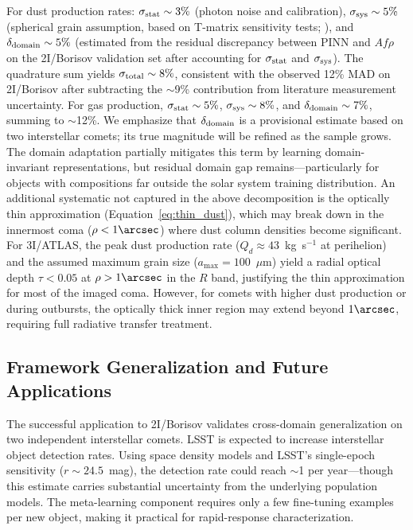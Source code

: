 \documentclass[preprint2]{aastex631}
\begin{document}
For dust production rates: $\sigma_{\rm stat} \sim 3\%$ (photon noise and calibration), $\sigma_{\rm sys} \sim 5\%$ (spherical grain assumption, based on T-matrix sensitivity tests; \citealt{kolokolova04,shen11}), and $\delta_{\rm domain} \sim 5\%$ (estimated from the residual discrepancy between PINN and $Af\rho$ on the 2I/Borisov validation set after accounting for $\sigma_{\rm stat}$ and $\sigma_{\rm sys}$). The quadrature sum yields $\sigma_{\rm total} \sim 8\%$, consistent with the observed 12\% MAD on 2I/Borisov after subtracting the $\sim$9\% contribution from literature measurement uncertainty. For gas production, $\sigma_{\rm stat} \sim 5\%$, $\sigma_{\rm sys} \sim 8\%$, and $\delta_{\rm domain} \sim 7\%$, summing to $\sim$12\%. We emphasize that $\delta_{\rm domain}$ is a provisional estimate based on two interstellar comets; its true magnitude will be refined as the sample grows. The domain adaptation partially mitigates this term by learning domain-invariant representations, but residual domain gap remains---particularly for objects with compositions far outside the solar system training distribution. An additional systematic not captured in the above decomposition is the optically thin approximation (Equation~\ref{eq:thin_dust}), which may break down in the innermost coma ($\rho < 1\arcsec$) where dust column densities become significant. For 3I/ATLAS, the peak dust production rate ($Q_d \approx 43$~kg~s$^{-1}$ at perihelion) and the assumed maximum grain size ($a_{\max} = 100$~$\mu$m) yield a radial optical depth $\tau < 0.05$ at $\rho > 1\arcsec$ in the $R$ band, justifying the thin approximation for most of the imaged coma. However, for comets with higher dust production or during outbursts, the optically thick inner region may extend beyond $1\arcsec$, requiring full radiative transfer treatment.

\subsection{Framework Generalization and Future Applications}

The successful application to 2I/Borisov validates cross-domain generalization on two independent interstellar comets. LSST is expected to increase interstellar object detection rates. Using \citet{jones18} space density models and LSST's single-epoch sensitivity ($r \sim 24.5$~mag), the detection rate could reach $\sim$1 per year---though this estimate carries substantial uncertainty from the underlying population models. The meta-learning component requires only a few fine-tuning examples per new object, making it practical for rapid-response characterization.
\end{document}
